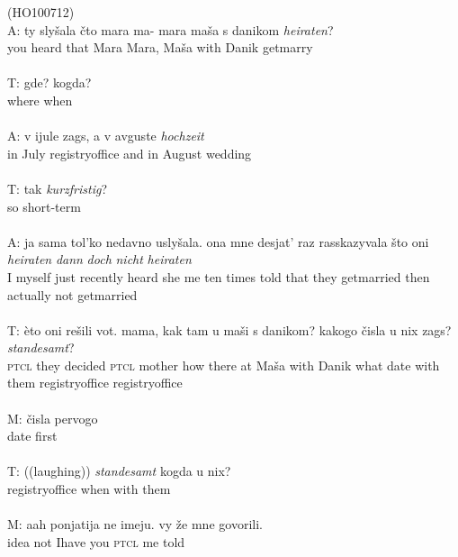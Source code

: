 \ea
\label{ex:3:1}
(HO100712)\\
 \gll A: ty slyšala čto mara ma- mara maša s danikom \textit{heiraten}?\\
	{} you heard that Mara {} Mara, Maša with Danik {get\textunderscore{}marry}\\ 
\glt \hfill \\ 
 \gll T: gde? kogda?\\
	{} where when\\
	\glt \hfill \\
\gll A: v ijule zags, a v avguste \textit{hochzeit} \\
	{}  in July {registry\textunderscore{}office} and in August wedding\\
\glt \hfill \\

\gll T: tak \textit{kurzfristig}?\\
	{}  so short-term\\
\glt \hfill \\

\gll A: ja sama tol'ko nedavno uslyšala. ona mne desjat' raz rasskazyvala \phantom{m} što oni \textit{heiraten} \textit{dann} \textit{doch} \textit{nicht} \textit{heiraten}\\
	{}  I myself just recently heard she me ten times told {} that they {get{\textunderscore}married} then actually not {get{\textunderscore}married}\\
\glt \hfill \\

\gll T: èto oni rešili vot. mama, kak tam u maši s danikom? \phantom{m} \phantom{m} kakogo čisla u nix zags? \textit{standesamt}?\\
	{} \textsc{ptcl} they decided \textsc{ptcl} mother how there at Maša with Danik {} {} what date with them {registry\textunderscore{}office} {registry\textunderscore{}office}\\
\glt \hfill \\

\gll M: čisla pervogo\\
    {} date first\\
\glt \hfill \\
    
\gll T: ((laughing)) \textit{standesamt} kogda u nix?\\
    {} {} {registry\textunderscore{}office} when with them\\
\glt \hfill \\

\gll M: aah ponjatija ne imeju. vy že mne govorili.\\
    {} {} idea not {I\textunderscore{}have} you \textsc{ptcl} me told\\
\glt \hfill \\

